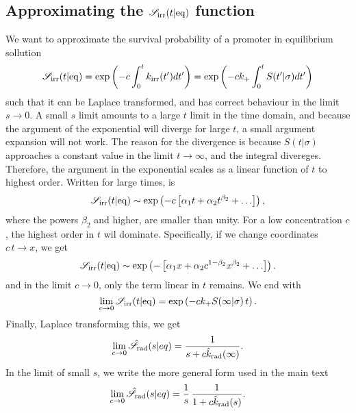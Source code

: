 \subsection{ Approximating the $\mathscr{S}_{\rm irr}(t|{\rm eq})$ function}
We want to approximate the survival probability of a promoter in equilibrium sollution
\begin{equation}
 \mathscr{S}_{\rm irr}(t|{\rm eq}) = {\rm exp}\left(-c \int_0^t k_{{\rm irr}}(t') dt'\right) = {\rm exp}\left(-c k_+ \int_0^t S(t'|\sigma) dt'\right)
 \elabel{Seq_app}
\end{equation}
such that it can be Laplace transformed, and has correct behaviour in the limit $s\to0$. A small $s$ limit amounts to a large $t$ limit in the time domain, and because the argument of the exponential will diverge for large $t$, a small argument expansion will not work. The reason for the divergence is because $S(t|\sigma)$ approaches a constant value in the limit $t\to\infty$, and the integral divereges. Therefore, the argument in the exponential scales as a linear function of $t$ to highest order. Written for large times,  is
\begin{equation}
 \mathscr{S}_{\rm irr}(t|{\rm eq}) \sim {\rm exp}\left(-c \left[ \alpha_1 t + \alpha_2 t^{\beta_2} + \ldots \right] \right),
\end{equation}
where the powers $\beta_2$ and higher, are smaller than unity. For a low concentration $c$, the highest order in $t$ wil dominate. Specifically, if we change coordinates $c\,t\to x$, we get
\begin{equation}
 \mathscr{S}_{\rm irr}(t|{\rm eq}) \sim {\rm exp}\left(-\left[ \alpha_1 x + \alpha_2 c^{1-\beta_2} x^{\beta_2} + \ldots \right] \right).
\end{equation}
and in the limit $c\to0$, only the term linear in $t$ remains. We end with
\begin{equation}
 \lim_{c\to0} \mathscr{S}_{\rm irr}(t|{\rm eq}) = {\rm exp}\left(-c k_+ S(\infty|\sigma) \, t \right).
\end{equation}
Finally, Laplace transforming this, we get
\begin{equation}
 \lim_{c \to 0} \hat{\mathscr{S}}_{\rm rad}(s|eq) = \frac{1}{s + c \hat{k}_{\rm rad}(\infty)}.
\end{equation}
In the limit of small $s$, we write the more general form used in the main text
\begin{equation}
 \lim_{c \to 0} \hat{\mathscr{S}}_{\rm rad}(s|eq) = \frac{1}{s} \, \frac{1}{1 + c \hat{k}_{\rm rad}(s)}.
\end{equation}

